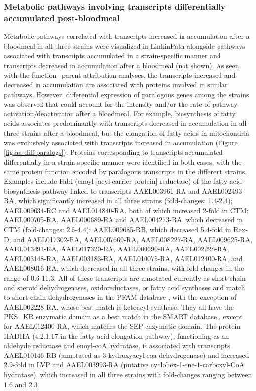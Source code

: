 \subsubsection{Metabolic pathways involving transcripts differentially accumulated post-bloodmeal}


Metabolic pathways correlated with transcripts increased in accumulation after a bloodmeal in all three strains were visualized in LinkinPath \cite{Ingsriswang2011} alongside pathways associated with transcripts accumulated in a strain-specific manner and transcripts decreased in accumulation after a bloodmeal (not shown).
As seen with the function−parent attribution analyses, the transcripts increased and decreased in accumulation are associated with proteins involved in similar pathways.
However, differential expression of paralogous genes among the strains was observed that could account for the intensity and/or the rate of pathway activation/deactivation after a bloodmeal.
For example, biosynthesis of fatty acids associates predominantly with transcripts decreased in accumulation in all three strains after a bloodmeal, but the elongation of fatty acids in mitochondria was exclusively associated with transcripts increased in accumulation (Figure \ref{fig:aa-diff-paralogs}).
Proteins corresponding to transcripts accumulated differentially in a strain-specific manner were identified in both cases, with the same protein function encoded by paralogous transcripts in the different strains.
Examples include FabI (enoyl-[acyl carrier protein] reductase) of the fatty acid biosynthesis pathway linked to transcripts AAEL003961-RA and AAEL002493-RA, which significantly increased in all three strains (fold-changes: 1.4-2.4); AAEL009634-RC and AAEL014840-RA, both of which increased 2-fold in \gls{CTM}; AAEL000705-RA, AAEL000689-RA and AAEL004273-RA, which decreased in \gls{CTM} (fold-changes: 2.5-4.4); AAEL009685-RB, which decreased 5.4-fold in \gls{Rex-D}; and AAEL017302-RA, AAEL007669-RA, AAEL008227-RA, AAEL009625-RA, AAEL013491-RA, AAEL017320-RA, AAEL000690-RA, AAEL002228-RA, AAEL003148-RA, AAEL003183-RA, AAEL010075-RA, AAEL012400-RA, and AAEL008016-RA, which decreased in all three strains, with fold-changes in the range of 0.6-11.3.
All of these transcripts are annotated currently as short-chain and steroid dehydrogenases, oxidoreductases, or fatty acid synthases \cite{Ribeiro-AegyXcel} and match to short-chain dehydrogenases in the PFAM database \cite{Finn2008}, with the exception of AAEL002228-RA, whose best match is ketoacyl synthase.
They all have the PKS\_KR enzymatic domain as a best match in the SMART database \cite{Letunic2009}, except for AAEL012400-RA, which matches the SEP enzymatic domain.
The protein HADHA (4.2.1.17 in the fatty acid elongation pathway), functioning as an aldehyde reductase and enoyl-coA hydratase, is associated with transcripts AAEL010146-RB (annotated as 3-hydroxyacyl-coa dehydrogenase) and increased 2.9-fold in \gls{LVP} and AAEL003993-RA (putative cyclohex-1-ene-1-carboxyl-CoA hydratase), which increased in all three strains with fold-changes ranging between 1.6 and 2.3.


